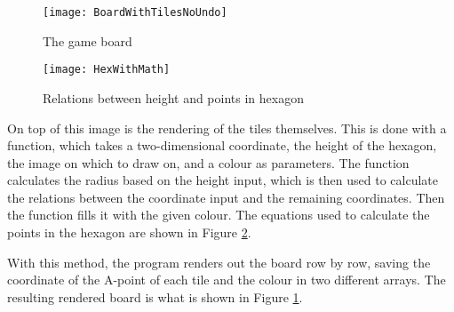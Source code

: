 \begin{figure}[h!]
\centering \texttt{[image: BoardWithTilesNoUndo]}
\caption{The game board \label{Fig:Board}}
\end{figure}

\begin{figure}[h!]
\centering \texttt{[image: HexWithMath]}
\caption{Relations between height and points in hexagon \label{Fig:HexWithMath}}
\end{figure}

On top of this image is the rendering of the tiles themselves. This is done with a function, which takes a two-dimensional coordinate, the height of the hexagon, the image on which to draw on, and a colour as parameters. The function calculates the radius based on the height input, which is then used to calculate the relations between the coordinate input and the remaining coordinates. Then the function fills it with the given colour. The equations used to calculate the points in the hexagon are shown in Figure \ref{Fig:HexWithMath}.

With this method, the program renders out the board row by row, saving the coordinate of the A-point of each tile and the colour in two different arrays. The resulting rendered board is what is shown in Figure \ref{Fig:Board}.